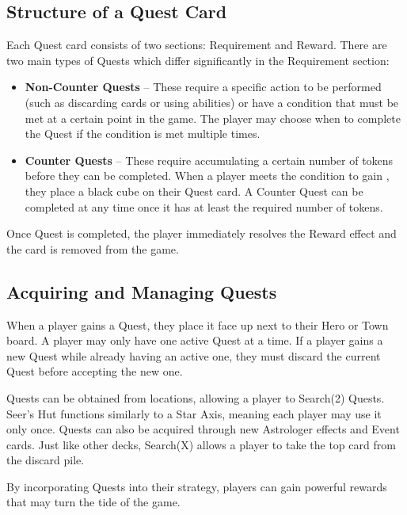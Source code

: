 \begin{multicols*}{2}
\subsection*{Structure of a Quest Card}

Each Quest card consists of two sections: Requirement and Reward.
There are two main types of Quests which differ significantly in the Requirement section:
\begin{itemize}
  \item \textbf{Non-Counter Quests} – These require a specific action to be performed (such as discarding cards or using abilities) or have a condition that must be met at a certain point in the game.
  The player may choose when to complete the Quest if the condition is met multiple times.
  \item \textbf{Counter Quests} – These require accumulating a certain number of  tokens before they can be completed.
  When a player meets the condition to gain , they place a black cube on their Quest card.
  A Counter Quest can be completed at any time once it has at least the required number of  tokens.
\end{itemize}

Once Quest is completed, the player immediately resolves the Reward effect and the card is removed from the game.

\subsection*{Acquiring and Managing Quests}
When a player gains a Quest, they place it face up next to their Hero or Town board.
A player may only have one active Quest at a time.
If a player gains a new Quest while already having an active one, they must discard the current Quest before accepting the new one.

Quests can be obtained from  locations, allowing a player to Search(2) Quests.
Seer’s Hut functions similarly to a Star Axis, meaning each player may use it only once.
Quests can also be acquired through new Astrologer effects and Event cards.
Just like other decks, Search(X) allows a player to take the top card from the discard pile.

By incorporating Quests into their strategy, players can gain powerful rewards that may turn the tide of the game.

{
  \bigskip
  \centering
  \begin{scriptsize}
  \end{scriptsize}

}
\end{multicols*}
